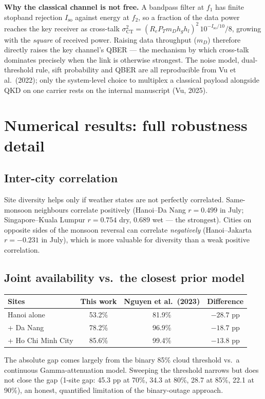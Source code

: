 \textbf{Why the classical channel is not free.} A bandpass filter at $f_1$ has finite stopband rejection $I_\text{so}$ against energy at $f_2$, so a fraction of the data power reaches the key receiver as cross-talk $\sigma_\text{CT}^2=(R_e P_T m_D h_g h_l)^2\,10^{-I_\text{so}/10}/8$, growing with the \emph{square} of received power. Raising data throughput ($m_D$) therefore directly raises the key channel's QBER --- the mechanism by which cross-talk dominates precisely when the link is otherwise strongest. The noise model, dual-threshold rule, sift probability and QBER are all reproducible from Vu et al.\ (2022); only the system-level choice to multiplex a classical payload alongside QKD on one carrier rests on the internal manuscript (Vu, 2025).

\section{Numerical results: full robustness detail}

\subsection{Inter-city correlation}
Site diversity helps only if weather states are not perfectly correlated. Same-monsoon neighbours correlate positively (Hanoi--Da Nang $r=0.499$ in July; Singapore--Kuala Lumpur $r=0.754$ dry, $0.689$ wet --- the strongest). Cities on opposite sides of the monsoon reversal can correlate \emph{negatively} (Hanoi--Jakarta $r=-0.231$ in July), which is more valuable for diversity than a weak positive correlation.

\subsection{Joint availability vs.\ the closest prior model}
\begin{center}\small
\begin{tabular}{@{}lccc@{}}\toprule
Sites & This work & Nguyen et al.\ (2023) & Difference \\ \midrule
Hanoi alone & 53.2\% & 81.9\% & $-28.7$ pp \\
+ Da Nang & 78.2\% & 96.9\% & $-18.7$ pp \\
+ Ho Chi Minh City & 85.6\% & 99.4\% & $-13.8$ pp \\ \bottomrule
\end{tabular}\end{center}
The absolute gap comes largely from the binary 85\% cloud threshold vs.\ a continuous Gamma-attenuation model. Sweeping the threshold narrows but does not close the gap (1-site gap: 45.3 pp at 70\%, 34.3 at 80\%, 28.7 at 85\%, 22.1 at 90\%), an honest, quantified limitation of the binary-outage approach.

